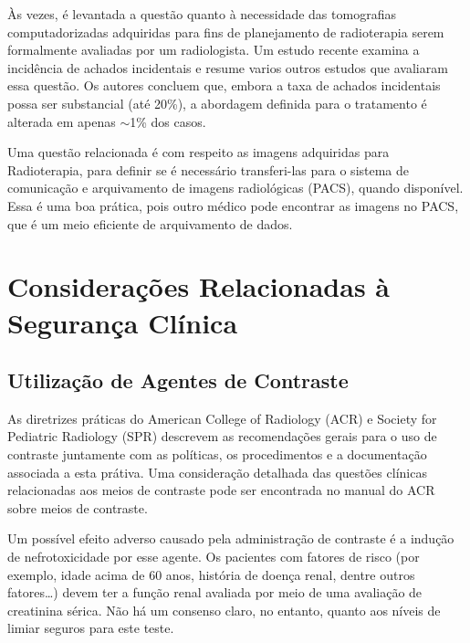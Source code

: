 \documentclass[11pt,a4paper]{article}
\newcounter{exemplo}
\begin{document}
	Às vezes, é levantada a questão quanto à necessidade das tomografias computadorizadas adquiridas para fins de planejamento de radioterapia serem formalmente avaliadas por um radiologista. Um estudo recente examina a incidência de achados incidentais e  resume varios outros estudos que avaliaram essa questão. Os autores concluem que, embora a taxa de achados incidentais possa ser substancial (até 20\%), a abordagem definida para o tratamento é alterada em apenas $\sim$1\% dos casos.

	Uma questão relacionada é com respeito as imagens adquiridas para Radioterapia, para definir se é necessário transferi-las para o sistema de comunicação e arquivamento de imagens radiológicas (PACS), quando disponível. Essa é uma boa prática, pois outro médico pode encontrar as imagens no PACS, que é um meio eficiente de arquivamento de dados.

\section{Considerações Relacionadas à Segurança Clínica}

\subsection*{Utilização de Agentes de Contraste}

	As diretrizes práticas do American College of Radiology (ACR) e Society for Pediatric Radiology (SPR) descrevem as recomendações gerais para o uso de contraste juntamente com as políticas, os procedimentos e a documentação associada a esta prátiva. Uma consideração detalhada das questões clínicas relacionadas aos meios de contraste pode ser encontrada no manual do ACR sobre meios de contraste.
	
	Um possível efeito adverso causado pela administração de contraste é a indução de nefrotoxicidade por esse agente. Os pacientes com fatores de risco (por exemplo, idade acima de 60 anos, história de doença renal, dentre outros fatores\dots) devem ter a função renal avaliada por meio de uma avaliação de creatinina sérica. Não há um consenso claro, no entanto, quanto aos níveis de limiar seguros para este teste. 
	
\end{document}
